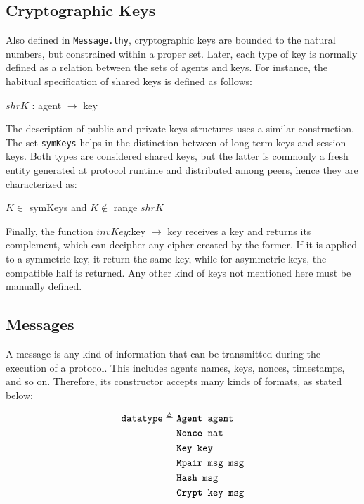 \subsection{Cryptographic Keys}
Also defined in \texttt{Message.thy}, cryptographic keys are bounded to the natural numbers, but constrained within a proper set. Later, each type of key is normally defined as a relation between the sets of agents and keys. For instance, the habitual specification of shared keys is defined as follows:

\begin{center}
  {\ttfamily $shrK$ : agent $\rightarrow$ key}
\end{center}

The description of public and private keys structures uses a similar construction. The set \texttt{symKeys} helps in the distinction between of long-term keys and session keys. Both types are considered shared keys, but the latter is commonly a fresh entity generated at protocol runtime and distributed among peers, hence they are characterized as:

\begin{center}
  {\ttfamily $K \in$ symKeys} and {\ttfamily $K \notin$ range $shrK$}
\end{center}

Finally, the function {\ttfamily $invKey$:key $\longrightarrow$ key} receives a key and returns its complement, which can decipher any cipher created by the former. If it is applied to a symmetric key, it return the same key, while for asymmetric keys, the compatible half is returned. Any other kind of keys not mentioned here must be manually defined.



\subsection{Messages}
A message is any kind of information that can be transmitted during the execution of a protocol. This includes agents names, keys, nonces, timestamps, and so on. Therefore, its constructor accepts many kinds of formats, as stated below:

\begin{equation*}
  \begin{split}
    \texttt{datatype} \triangleq\
    & \texttt{\textbf{Agent} agent} \\
    & \texttt{\textbf{Nonce} nat} \\
    & \texttt{\textbf{Key} key} \\
    & \texttt{\textbf{Mpair} msg msg} \\
    & \texttt{\textbf{Hash} msg} \\
    & \texttt{\textbf{Crypt} key msg}
  \end{split}
\end{equation*}

